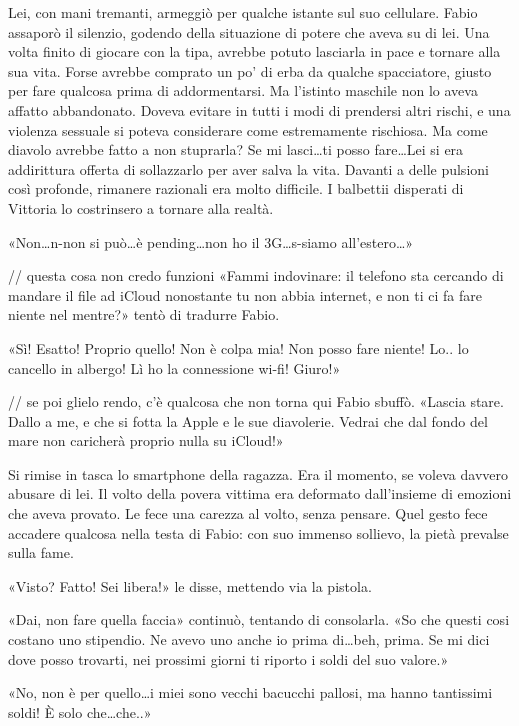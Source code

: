 Lei, con mani tremanti, armeggiò per qualche istante sul suo cellulare. Fabio assaporò il silenzio, godendo della situazione di potere che aveva su di lei. Una volta finito di giocare con la tipa, avrebbe potuto lasciarla in pace e tornare alla sua vita. Forse avrebbe comprato un po' di erba da qualche spacciatore, giusto per fare qualcosa prima di addormentarsi. Ma l'istinto maschile non lo aveva affatto abbandonato. Doveva evitare in tutti i modi di prendersi altri rischi, e una violenza sessuale si poteva considerare come estremamente rischiosa. Ma come diavolo avrebbe fatto a non stuprarla? Se mi lasci\ldots ti posso fare\ldots Lei si era addirittura offerta di sollazzarlo per aver salva la vita. Davanti a delle pulsioni così profonde, rimanere razionali era molto difficile. I balbettii disperati di Vittoria lo costrinsero a tornare alla realtà.

«Non\ldots n-non si può\ldots è pending\ldots non ho il 3G\ldots s-siamo all'estero\ldots»

// questa cosa non credo funzioni
«Fammi indovinare: il telefono sta cercando di mandare il file ad iCloud nonostante tu non abbia internet, e non ti ci fa fare niente nel mentre?» tentò di tradurre Fabio.

«Sì! Esatto! Proprio quello! Non è colpa mia! Non posso fare niente! Lo.. lo cancello in albergo! Lì ho la connessione wi-fi! Giuro!»

// se poi glielo rendo, c'è qualcosa che non torna qui
Fabio sbuffò. «Lascia stare. Dallo a me, e che si fotta la Apple e le sue diavolerie. Vedrai che dal fondo del mare non caricherà proprio nulla su iCloud!»

Si rimise in tasca lo smartphone della ragazza. Era il momento, se voleva davvero abusare di lei. Il volto della povera vittima era deformato dall'insieme di emozioni che aveva provato. Le fece una carezza al volto, senza pensare. Quel gesto fece accadere qualcosa nella testa di Fabio: con suo immenso sollievo, la pietà prevalse sulla fame.

«Visto? Fatto! Sei libera!» le disse, mettendo via la pistola.

«Dai, non fare quella faccia» continuò, tentando di consolarla. «So che questi cosi costano uno stipendio. Ne avevo uno anche io prima di\ldots beh, prima. Se mi dici dove posso trovarti, nei prossimi giorni ti riporto i soldi del suo valore.»

«No, non è per quello\ldots i miei sono vecchi bacucchi pallosi, ma hanno tantissimi soldi! È solo che\ldots che..»

